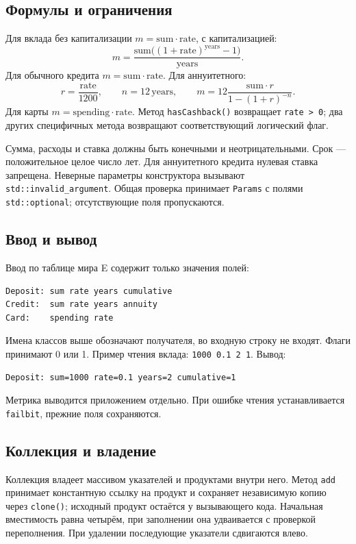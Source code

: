 \subsection{Формулы и ограничения}
Для вклада без капитализации $m=\mathrm{sum}\cdot\mathrm{rate}$, с капитализацией:
\[
m=\frac{\mathrm{sum}\big((1+\mathrm{rate})^{\mathrm{years}}-1\big)}{\mathrm{years}}.
\]
Для обычного кредита $m=\mathrm{sum}\cdot\mathrm{rate}$. Для аннуитетного:
\[
r=\frac{\mathrm{rate}}{1200},\qquad n=12\,\mathrm{years},\qquad
m=12\frac{\mathrm{sum}\cdot r}{1-(1+r)^{-n}}.
\]
Для карты $m=\mathrm{spending}\cdot\mathrm{rate}$. Метод \texttt{hasCashback()} возвращает \texttt{rate > 0}; два других специфичных метода возвращают соответствующий логический флаг.

Сумма, расходы и ставка должны быть конечными и неотрицательными. Срок --- положительное целое число лет. Для аннуитетного кредита нулевая ставка запрещена. Неверные параметры конструктора вызывают \texttt{std::invalid\_argument}. Общая проверка принимает \texttt{Params} с полями \texttt{std::optional}; отсутствующие поля пропускаются.

\subsection{Ввод и вывод}
Ввод по таблице мира E содержит только значения полей:
\begin{verbatim}
Deposit: sum rate years cumulative
Credit:  sum rate years annuity
Card:    spending rate
\end{verbatim}
Имена классов выше обозначают получателя, во входную строку не входят. Флаги принимают 0 или 1. Пример чтения вклада: \texttt{1000 0.1 2 1}. Вывод:
\begin{verbatim}
Deposit: sum=1000 rate=0.1 years=2 cumulative=1
\end{verbatim}
Метрика выводится приложением отдельно. При ошибке чтения устанавливается \texttt{failbit}, прежние поля сохраняются.

\subsection{Коллекция и владение}
Коллекция владеет массивом указателей и продуктами внутри него. Метод \texttt{add} принимает константную ссылку на продукт и сохраняет независимую копию через \texttt{clone()}; исходный продукт остаётся у вызывающего кода. Начальная вместимость равна четырём, при заполнении она удваивается с проверкой переполнения. При удалении последующие указатели сдвигаются влево.

